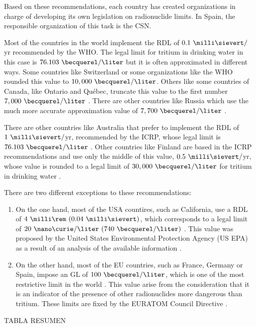 Based on these recommendations, each country has created organizations in charge of developing its own legislation on radionuclide limits. In Spain, the responsible organization of this task is the CSN.

Most of the countries in the world implement the RDL of $0.1~\milli\sievert/$yr recommended by the WHO. The legal limit for tritium in drinking water in this case is $76.103~\becquerel/\liter$  but it is often approximated in different ways. Some countries like Switzerland \cite{Switzerland_GL} or some organizations like the WHO \cite{WHO_GL} rounded this value to $10,000~\becquerel/\liter$. Others like some countries of Canada, like Ontario and Québec, truncate this value to the first number $7,000~\becquerel/\liter$ \cite{Ontario_GL, Quebec_GL}. There are other countries like Russia which use the much more accurate approximation value of $7,700~\becquerel/\liter$ \cite{Russia_GL}.

There are other countries like Australia that prefer to implement the RDL of $1~\milli\sievert/$yr, recommended by the ICRP, whose legal limit is $76.103~\becquerel/\liter$ \cite{Australia_GL}. Other countries like Finland are based in the ICRP recommendations and use only the middle of this value, $0.5~\milli\sievert/$yr, whose value is rounded to a legal limit of $30,000~\becquerel/\liter$ for tritium in drinking water \cite{Finland_GL}.

There are two different exceptions to these recommendations:
\begin{enumerate}
\item{} On the one hand, most of the USA countires, such as California, use a RDL of $4~\milli\rem~(0.04~\milli\sievert)$, which corresponds to a legal limit of $20~\nano\curie/\liter~(740~\becquerel/\liter)$ \cite{California_GL}. This value was proposed by the United States Environmental Protection Agency (US EPA) as a result of an analysis of the available information \cite{USEPA_GL}.

\item{} On the other hand, most of the EU countries, such as France, Germany or Spain, impose an GL of $100~\becquerel/\liter$, which is one of the most restrictive limit in the world \cite{France_GL, Germany_GL, Spain_GL}. This value arise from the consideration that it is an indicator of the presence of other radionuclides more dangerous than tritium. These limits are fixed by the EURATOM Council Directive \cite{EURATOM_GL}. 
\end{enumerate}

TABLA RESUMEN